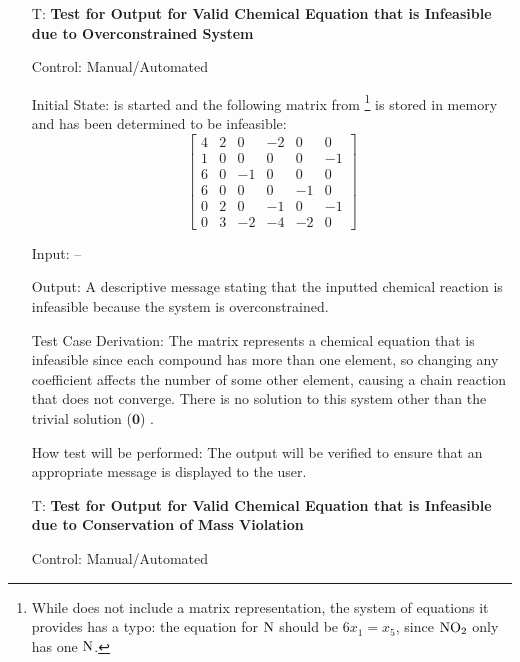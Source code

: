 \documentclass[12pt, titlepage]{article}
\newcounter{testnum} %
\begin{document}
\begin{enumerate}

  \item[T\refstepcounter{testnum}\thetestnum \label{test_over_valid_out}:]
    \textbf{Test for Output for Valid Chemical Equation that is Infeasible
      due to Overconstrained System}

    Control: Manual/Automated 

    Initial State: \progname{} is started and the following matrix from
    \cite{hamid_balancing_2019}\footnote{While \cite{hamid_balancing_2019}
      does not include a matrix representation, the
      system of equations it provides has a typo: the equation for $\ce{N}$
      should be $6x_1 = x_5$, since $\ce{NO2}$ only has one $\ce{N}$.} is
    stored in memory and has been determined to be infeasible:
    $$\begin{bmatrix}
        4 & 2 & 0  & -2 & 0  & 0  \\
        1 & 0 & 0  & 0  & 0  & -1 \\
        6 & 0 & -1 & 0  & 0  & 0  \\
        6 & 0 & 0  & 0  & -1 & 0  \\
        0 & 2 & 0  & -1 & 0  & -1 \\
        0 & 3 & -2 & -4 & -2 & 0
      \end{bmatrix}$$

    Input: --

    Output: A descriptive message stating that the inputted chemical reaction
    is infeasible because the system is overconstrained.

    Test Case Derivation: The matrix represents a chemical equation that is
    infeasible since
    each compound has more than one element, so changing any coefficient
    affects the number of some other element, causing a chain reaction that
    does not converge. There is no solution to this system other than the
    trivial solution ($\mathbf{0}$) \cite{hamid_balancing_2019}.

    How test will be performed: The output will be verified to ensure that an
    appropriate message is displayed to the user.

  \item[T\refstepcounter{testnum}\thetestnum \label{test_cons_mass_valid_out}:]
    \textbf{Test for Output for Valid Chemical Equation that is Infeasible
      due to Conservation of Mass Violation}

    Control: Manual/Automated 


\end{enumerate}
\end{document}

